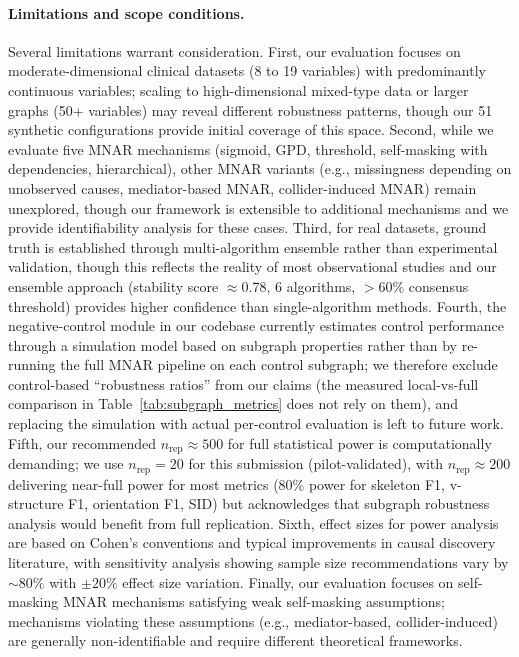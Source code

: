 \documentclass[runningheads]{llncs}
\newcommand{\katerina}{\textcolor{blue}}
\newcommand{\Matin}{\textcolor{magenta}}
\begin{document}
\paragraph{Limitations and scope conditions.}
Several limitations warrant consideration. First, our evaluation focuses on moderate-dimensional clinical datasets (8 to 19 variables) with predominantly continuous variables; scaling to high-dimensional mixed-type data or larger graphs (50+ variables) may reveal different robustness patterns, though our 51 synthetic configurations provide initial coverage of this space. Second, while we evaluate five MNAR mechanisms (sigmoid, GPD, threshold, self-masking with dependencies, hierarchical), other MNAR variants (e.g., missingness depending on unobserved causes, mediator-based MNAR, collider-induced MNAR) remain unexplored, though our framework is extensible to additional mechanisms and we provide identifiability analysis for these cases. Third, for real datasets, ground truth is established through multi-algorithm ensemble rather than experimental validation, though this reflects the reality of most observational studies and our ensemble approach (stability score $\approx$0.78, 6 algorithms, $>$60\% consensus threshold) provides higher confidence than single-algorithm methods. Fourth, the negative-control module in our codebase currently estimates control performance through a simulation model based on subgraph properties rather than by re-running the full MNAR pipeline on each control subgraph; we therefore exclude control-based ``robustness ratios'' from our claims (the measured local-vs-full comparison in Table~\ref{tab:subgraph_metrics} does not rely on them), and replacing the simulation with actual per-control evaluation is left to future work. Fifth, our recommended $n_{\text{rep}}\approx 500$ for full statistical power is computationally demanding; we use $n_{\text{rep}}=20$ for this submission (pilot-validated), with $n_{\text{rep}}\approx 200$ delivering near-full power for most metrics (80\% power for skeleton F1, v-structure F1, orientation F1, SID) but acknowledges that subgraph robustness analysis would benefit from full replication. Sixth, effect sizes for power analysis are based on Cohen's conventions \cite{cohen2013statistical}  and typical improvements in causal discovery literature, with sensitivity analysis showing sample size recommendations vary by $\sim 80\%$ with $\pm 20\%$ effect size variation. Finally, our evaluation focuses on self-masking MNAR mechanisms satisfying weak self-masking assumptions; mechanisms violating these assumptions (e.g., mediator-based, collider-induced) are generally non-identifiable and require different theoretical frameworks. 
\end{document}
